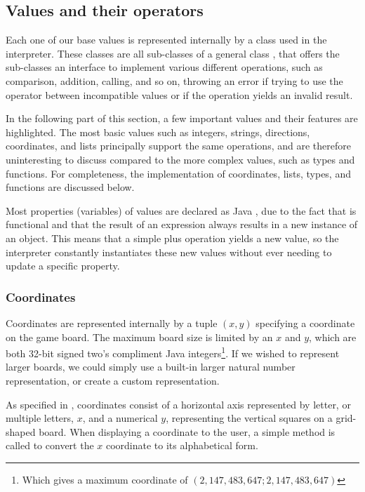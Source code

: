 \subsection{Values and their operators}
Each one of our base values is represented internally by a class used in
the interpreter. These classes are all sub-classes of a general class
, that offers the sub-classes an interface to implement
various different operations, such as comparison, addition, calling,
and so on, throwing an error if trying to use the operator between
incompatible values or if the operation yields an invalid result.

In the following part of this section, a few important values and their
features are highlighted. The most basic values such as integers,
strings, directions, coordinates, and lists principally support the same
operations, and are therefore uninteresting to discuss compared to the
more complex values, such as types and functions. For completeness, the
implementation of coordinates, lists, types, and functions are discussed
below.

Most properties (variables) of values are declared as Java
, due to the fact that \productname{} is functional and
that the result of an expression always results in a new instance of an
object. This means that a simple plus operation yields a new value, so
the interpreter constantly instantiates these new values without ever
needing to update a specific property.

\subsubsection{Coordinates}
Coordinates are represented internally by a tuple $(x, y)$ specifying
a coordinate on the game board. The maximum board size is limited by
an $x$ and $y$, which are both 32-bit signed two's compliment Java
integers\footnote{Which gives a maximum coordinate of $(2,147,483,647;
2,147,483,647)$}. If we wished to represent larger boards, we could
simply use a built-in larger natural number representation, or create a
custom representation.

As specified in , coordinates consist of
a horizontal axis represented by letter, or multiple letters, $x$, and a
numerical $y$, representing the vertical squares on a grid-shaped board.
When displaying a coordinate to the user, a simple method is called to
convert the $x$ coordinate to its alphabetical form.

